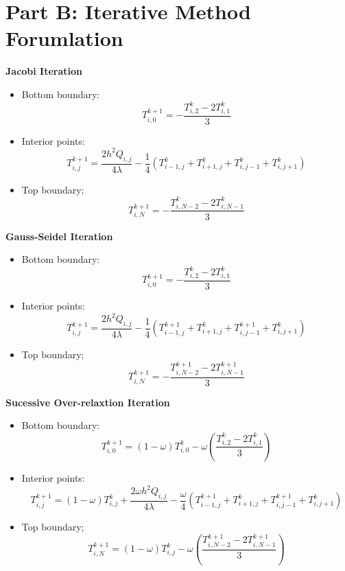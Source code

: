 \documentclass[reqno, 12pt]{amsart}
\begin{document}
    \section{Part B: Iterative Method Forumlation}
    \noindent\textbf{Jacobi Iteration}
    \begin{itemize}
        \item Bottom boundary:
            \[T_{i,0}^{k+1} = -\frac{T_{i, 2}^k - 2T_{i,1}^k}{3} \]
        \item Interior points:
        \[T_{i,j}^{k+1} = \frac{2h^2Q_{i,j}}{4\lambda} -
        \frac{1}{4}\left(T_{i-1,j}^k + T_{i + 1, j}^k + T_{i,j-1}^k + T_{i, j+1}^k\right)\]
        \item Top boundary;
            \[T_{i,N}^{k+1} = -\frac{T_{i, N-2}^k - 2T_{i,N-1}^k}{3}\]
    \end{itemize}
    \noindent\textbf{Gauss-Seidel Iteration}
    \begin{itemize}
        \item Bottom boundary:
            \[T_{i,0}^{k+1} = -\frac{T_{i, 2}^k - 2T_{i,1}^k}{3} \]
        \item Interior points:
        \[T_{i,j}^{k+1} = \frac{2h^2Q_{i,j}}{4\lambda} -
        \frac{1}{4}\left(T_{i-1,j}^{k+1} + T_{i + 1, j}^{k} + T_{i,j-1}^{k+1} + T_{i, j+1}^k\right)\]
        \item Top boundary;
            \[T_{i,N}^{k+1} = -\frac{T_{i, N-2}^{k+1} - 2T_{i,N-1}^{k + 1}}{3}\]
    \end{itemize}
    \noindent\textbf{Sucessive Over-relaxtion Iteration}
    \begin{itemize}
        \item Bottom boundary:
            \[T_{i,0}^{k+1} = (1 - \omega)T_{i,0}^k -\omega\left(\frac{T_{i, 2}^k - 2T_{i,1}^k}{3}\right) \]
        \item Interior points:
            \[T_{i,j}^{k+1} = (1-\omega)T_{i,j}^k + \frac{2\omega h^2Q_{i,j}}{4\lambda} -
        \frac{\omega}{4}\left(T_{i-1,j}^{k+1} + T_{i + 1, j}^{k} + T_{i,j-1}^{k+1} + T_{i, j+1}^k\right)\]
        \item Top boundary;
            \[T_{i,N}^{k+1} = (1-\omega)T_{i,j}^k -\omega\left(\frac{T_{i, N-2}^{k+1} - 2T_{i,N-1}^{k + 1}}{3}\right)\]
    \end{itemize}
\end{document}
